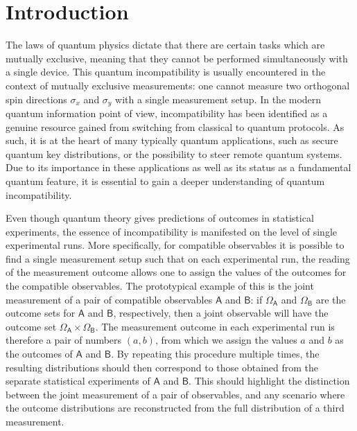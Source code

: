 \documentclass[12pt]{amsart}
\theoremstyle{definition}
\newcommand{\A}{\mathsf{A}}%
\newcommand{\B}{\mathsf{B}}%
\begin{document}




\section{Introduction}

The laws of quantum physics dictate that there are certain tasks which are mutually exclusive, meaning that they cannot be performed simultaneously with a single device. 
This quantum incompatibility is usually encountered in the context of mutually exclusive measurements: one cannot measure two orthogonal spin directions $\sigma_x$ and $\sigma_y$ with a single measurement setup. In the modern quantum information point of view, incompatibility has been identified as a genuine resource gained from switching from classical to quantum protocols. As such, it is at the heart of many typically quantum applications, such as secure quantum key distributions, or the possibility to steer remote quantum systems. Due to its importance in these applications as well as its status as a fundamental quantum feature, it is essential to gain a deeper understanding of quantum incompatibility. 


Even though quantum theory gives predictions of outcomes in statistical experiments, the essence of incompatibility is manifested on the level of single experimental runs. More specifically, for compatible observables it is possible to find a single measurement setup such that on each experimental run, the reading of the measurement outcome allows one to assign the values of the outcomes for the compatible observables. The prototypical example of this is the joint measurement of a pair of compatible observables $\A$ and $\B$: if $\Omega_\A$ and $\Omega_\B$ are the outcome sets for $\A$ and $\B$, respectively, then a joint observable will have the outcome set $\Omega_\A\times \Omega_\B$. The measurement outcome in each experimental run is therefore a pair of numbers $(a,b)$, from which we assign the values $a$ and $b$ as the outcomes  of $\A$ and $\B$. By repeating this procedure multiple times, the resulting distributions should then correspond to those obtained from the separate statistical experiments of $\A$ and $\B$. This should highlight the distinction between the joint measurement of a pair of observables, and any scenario where the outcome distributions are reconstructed from the full distribution of a third measurement.
\end{document}
